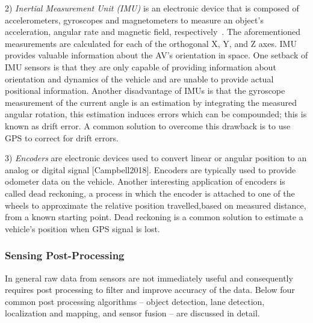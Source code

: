 \documentclass{article}
\begin{document}
2) \emph{Inertial Measurement Unit (IMU)} is an electronic device that is composed of accelerometers, gyroscopes and magnetometers to measure an object’s acceleration, angular rate and magnetic field, respectively~\cite{Campbell2018}. The aforementioned measurements are calculated for each of the orthogonal X, Y, and Z axes.  IMU provides valuable information about the AV’s orientation in space. One setback of   IMU sensors is that they are only  capable of providing information about orientation and dynamics of the vehicle and are unable to provide actual positional information. Another disadvantage of IMUs is that the gyroscope measurement of the current angle is an estimation by integrating the measured angular rotation, this estimation induces errors which can be compounded; this is known as drift error. A common solution to overcome this drawback is to use GPS to correct for drift errors.

3) \emph{Encoders} are electronic devices used to convert linear or angular position to an analog or digital signal [Campbell2018]. Encoders are typically used to provide odometer data on the vehicle. Another interesting application of encoders is called dead reckoning, a process in which the encoder is attached to one of the wheels  to approximate the relative position travelled,based on measured distance, from a known starting point. Dead reckoning is a common solution to estimate a vehicle's position when GPS signal is lost.

\subsubsection{Sensing Post-Processing} 

In general raw data from sensors are not immediately useful and consequently requires post processing to filter and improve accuracy of the data. Below four common post processing algorithms -- object detection, lane detection, localization and mapping, and sensor fusion -- are discussed in detail.
\end{document}
